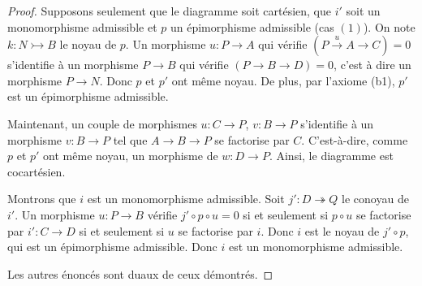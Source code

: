 \documentclass{amsart}
\newcommand{\sref}[2]{\hyperref[#2]{#1 \ref*{#2}}}
\theoremstyle{plain}
\theoremstyle{definition}
\theoremstyle{remark}
\newcommand{\ra}{\rightarrow}
\begin{document}
\begin{proof}
  Supposons seulement que le diagramme soit cartésien, que $i'$ soit un monomorphisme admissible et $p$ un épimorphisme admissible (cas $(1)$).
  On note $k:N\rightarrowtail B$ le noyau de $p$. Un morphisme $u:P\ra A$ qui vérifie
  $(P\xrightarrow{u} A\ra C)=0$ s'identifie à un morphisme $P\ra B$ qui vérifie $(P\ra B\ra D)=0$, c'est à dire un morphisme $P\ra N$.
  Donc $p$ et $p'$ ont même noyau. De plus, par l'axiome (b1), $p'$ est un épimorphisme admissible.

  Maintenant, un couple de morphismes $u:C\ra P$, $v:B\ra P$ s'identifie à un morphisme $v:B\ra P$ tel que $A\ra B\ra P$ se factorise
  par $C$. C'est-à-dire, comme $p$ et $p'$ ont même noyau, un morphisme de $w:D\ra P$. Ainsi, le diagramme est cocartésien.
  
  Montrons que $i$ est un monomorphisme admissible. Soit $j':D\twoheadrightarrow Q$ le conoyau de $i'$. Un morphisme $u:P\ra B$
  vérifie $j'\circ p\circ u=0$ si et seulement si $p\circ u$ se factorise par $i':C\ra D$ si et seulement si $u$ se factorise par $i$.
  Donc $i$ est le noyau de $j'\circ p$, qui est un épimorphisme admissible. Donc $i$ est un monomorphisme admissible.
  
  Les autres énoncés sont duaux de ceux démontrés.
\end{proof}


\end{document}

